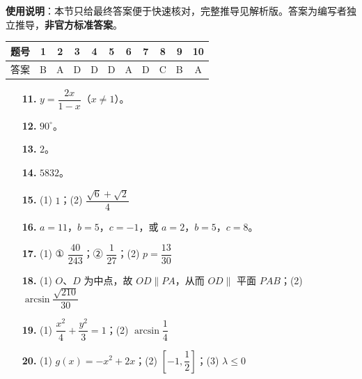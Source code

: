 
\begin{gknotice}
\textbf{使用说明}：本节只给最终答案便于快速核对，完整推导见解析版。答案为编写者独立推导，\textbf{非官方标准答案}。
\end{gknotice}

\begin{center}\begin{tabular}{ccccccccccc}
\toprule
题号 & 1 & 2 & 3 & 4 & 5 & 6 & 7 & 8 & 9 & 10 \\
\midrule
答案 & B & A & D & D & D & A & D & C & B & A \\
\bottomrule
\end{tabular}\end{center}

\begin{itemize}[leftmargin=2.6em]
  \item[\textbf{11.}] $y = \dfrac{2x}{1 - x}$（$x \neq 1$）。
  \item[\textbf{12.}] $90^\circ$。
  \item[\textbf{13.}] $2$。
  \item[\textbf{14.}] $5832$。
\end{itemize}

\begin{itemize}[leftmargin=2.6em]
  \item[\textbf{15.}] (1) $1$；(2) $\dfrac{\sqrt{6} + \sqrt{2}}{4}$
  \item[\textbf{16.}] $a = 11$，$b = 5$，$c = -1$，或 $a = 2$，$b = 5$，$c = 8$。
  \item[\textbf{17.}] (1) ① $\dfrac{40}{243}$；② $\dfrac{1}{27}$；(2) $p = \dfrac{13}{30}$
  \item[\textbf{18.}] (1) $O$、$D$ 为中点，故 $OD \parallel PA$，从而 $OD \parallel$ 平面 $PAB$；(2) $\arcsin\dfrac{\sqrt{210}}{30}$
  \item[\textbf{19.}] (1) $\dfrac{x^2}{4} + \dfrac{y^2}{3} = 1$；(2) $\arcsin\dfrac{1}{4}$
  \item[\textbf{20.}] (1) $g(x) = -x^2 + 2x$；(2) $\left[-1, \dfrac{1}{2}\right]$；(3) $\lambda \leqslant 0$
\end{itemize}
